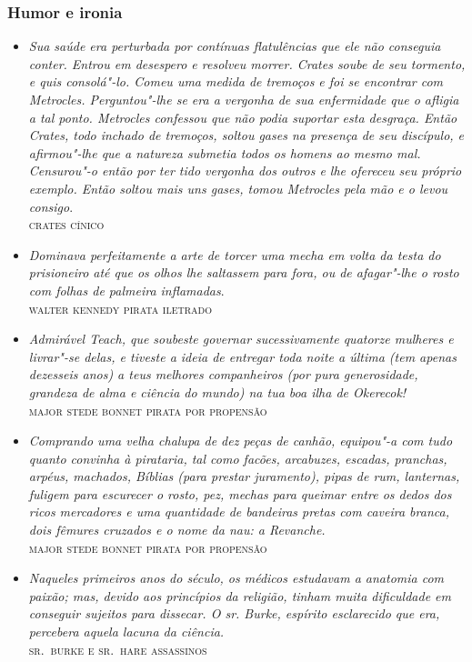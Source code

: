 \documentclass[12pt]{extarticle}
\begin{document}
\subsubsection{Humor e ironia}

\begin{itemize}
\item\emph{Sua saúde era perturbada por contínuas flatulências que ele não
conseguia conter. Entrou em desespero e resolveu morrer. Crates soube de
seu tormento, e quis consolá"-lo. Comeu uma medida de tremoços e foi se
encontrar com Metrocles. Perguntou"-lhe se era a vergonha de sua
enfermidade que o afligia a tal ponto. Metrocles confessou que não podia
suportar esta desgraça. Então Crates, todo inchado de tremoços, soltou
gases na presença de seu discípulo, e afirmou"-lhe que a natureza
submetia todos os homens ao mesmo mal. Censurou"-o então por ter tido
vergonha dos outros e lhe ofereceu seu próprio exemplo. Então soltou
mais uns gases, tomou Metrocles pela mão e o levou consigo}.\\
\textsc{crates cínico}

\item\emph{Dominava perfeitamente a arte de torcer uma mecha em volta da
testa do prisioneiro até que os olhos lhe saltassem para fora, ou de
afagar"-lhe o rosto com folhas de palmeira inflamadas}.\\
\textsc{walter kennedy pirata iletrado}

\item\emph{Admirável Teach, que soubeste governar sucessivamente quatorze
mulheres e livrar"-se delas, e tiveste a ideia de entregar toda noite a
última (tem apenas dezesseis anos) a teus melhores companheiros (por
pura generosidade, grandeza de alma e ciência do mundo) na tua boa ilha
de Okerecok!}\\
\textsc{major stede bonnet pirata por propensão}

\item\emph{Comprando uma velha chalupa de dez peças de canhão, equipou"-a
com tudo quanto convinha à pirataria, tal como facões, arcabuzes,
escadas, pranchas, arpéus, machados, Bíblias (para prestar juramento),
pipas de rum, lanternas, fuligem para escurecer o rosto, pez, mechas
para queimar entre os dedos dos ricos mercadores e uma quantidade de
bandeiras pretas com caveira branca, dois fêmures cruzados e o nome da
nau: a Revanche.}\\
\textsc{major stede bonnet pirata por propensão}

\item\emph{Naqueles primeiros anos do século, os médicos estudavam a
anatomia com paixão; mas, devido aos princípios da religião, tinham
muita dificuldade em conseguir sujeitos para dissecar. O sr. Burke,
espírito esclarecido que era, percebera aquela lacuna da ciência.}\\
\textsc{sr.~burke e sr.~hare assassinos}
\end{itemize}
\end{document}
